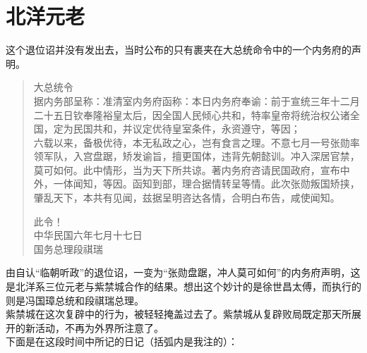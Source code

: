 \fancyhead[RO]{} %
\fancyhead[LE]{} %
\chapter*{北洋元老}
\thispagestyle{empty}
这个退位诏并没有发出去，当时公布的只有裹夹在大总统命令中的一个内务府的声明。\\

\begin{quote}
	大总统令\\

据内务部呈称：准清室内务府函称：本日内务府奉谕：前于宣统三年十二月二十五日钦奉隆裕皇太后，因全国人民倾心共和，特率皇帝将统治权公诸全国，定为民国共和，并议定优待皇室条件，永资遵守，等因；\\

六载以来，备极优待，本无私政之心，岂有食言之理。不意七月一号张勋率领军队，入宫盘踞，矫发谕旨，擅更国体，违背先朝懿训。冲入深居官禁，莫可如何。此中情形，当为天下所共谅。著内务府咨请民国政府，宣布中外，一体闻知，等因。函知到部，理合据情转呈等情。此次张勋叛国矫挟，肇乱天下，本共有见闻，兹据呈明咨达各情，合明白布告，咸使闻知。\\

\begin{flushright}
	此令！\\

中华民国六年七月十七日\\

国务总理段祺瑞
\end{flushright}
\end{quote}

由自认“临朝听政”的退位诏，一变为“张勋盘踞，冲人莫可如何”的内务府声明，这是北洋系三位元老与紫禁城合作的结果。想出这个妙计的是徐世昌太傅，而执行的则是冯国璋总统和段祺瑞总理。\\

紫禁城在这次复辟中的行为，被轻轻掩盖过去了。紫禁城从复辟败局既定那天所展开的新活动，不再为外界所注意了。\\

下面是在这段时间中所记的日记（括弧内是我注的）：\\


